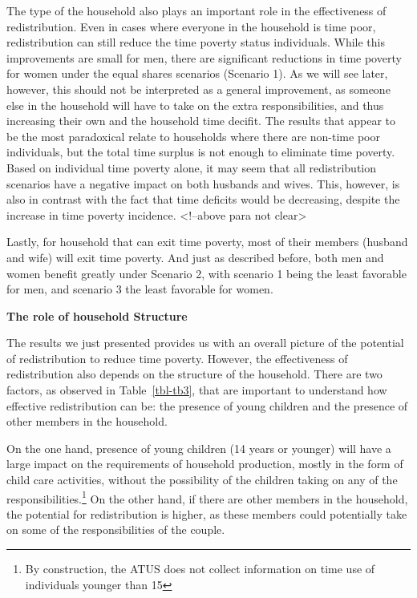 \documentclass[
  11pt,
]{article}
\begin{document}
The type of the household also plays an important role in the
effectiveness of redistribution. Even in cases where everyone in the
household is time poor, redistribution can still reduce the time poverty
status individuals. While this improvements are small for men, there are
significant reductions in time poverty for women under the equal shares
scenarios (Scenario 1). As we will see later, however, this should not
be interpreted as a general improvement, as someone else in the
household will have to take on the extra responsibilities, and thus
increasing their own and the household time decifit. The results that
appear to be the most paradoxical relate to households where there are
non-time poor individuals, but the total time surplus is not enough to
eliminate time poverty. Based on individual time poverty alone, it may
seem that all redistribution scenarios have a negative impact on both
husbands and wives. This, however, is also in contrast with the fact
that time deficits would be decreasing, despite the increase in time
poverty incidence. \textless!--above para not clear\textgreater{}

Lastly, for household that can exit time poverty, most of their members
(husband and wife) will exit time poverty. And just as described before,
both men and women benefit greatly under Scenario 2, with scenario 1
being the least favorable for men, and scenario 3 the least favorable
for women.

\textbf{The role of household Structure}

The results we just presented provides us with an overall picture of the
potential of redistribution to reduce time poverty. However, the
effectiveness of redistribution also depends on the structure of the
household. There are two factors, as observed in Table~\ref{tbl-tb3},
that are important to understand how effective redistribution can be:
the presence of young children and the presence of other members in the
household.

On the one hand, presence of young children (14 years or younger) will
have a large impact on the requirements of household production, mostly
in the form of child care activities, without the possibility of the
children taking on any of the responsibilities.\footnote{By
  construction, the ATUS does not collect information on time use of
  individuals younger than 15} On the other hand, if there are other
members in the household, the potential for redistribution is higher, as
these members could potentially take on some of the responsibilities of
the couple.
\end{document}
